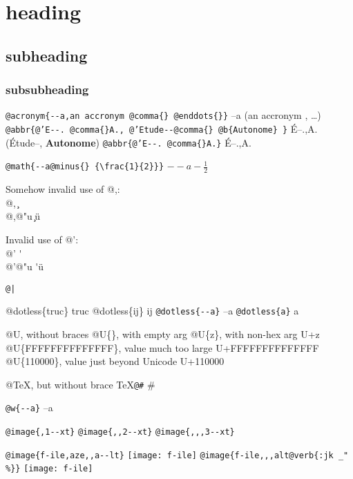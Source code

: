 \documentclass{book}
\newcommand{\GNUTexinfoplaceholder}[1]{}
\newcommand{\GNUTexinfonopagebreakheading}[2]{\let\clearpage\relax \let\cleardoublepage\relax \let\thispagestyle\GNUTexinfoplaceholder #1{#2}}
\renewcommand{\includegraphics}[1]{\fbox{FIG \detokenize{#1}}}
\begin{document}
\GNUTexinfonopagebreakheading{\section*}{{heading}}

\GNUTexinfonopagebreakheading{\subsection*}{{subheading}}

\GNUTexinfonopagebreakheading{\subsubsection*}{{subsubheading}}


\texttt{@acronym\{{-}{-}a,an accronym @comma\{\} @enddots\{\}\}} --a (an accronym , \dots{})
\texttt{@abbr\{@'E{-}{-}.\ @comma\{\}A.,\ @'Etude{-}{-}@comma\{\} @b\{Autonome\} \}} \'{E}--.\@ ,A.\@ (\'{E}tude--, \textbf{Autonome})
\texttt{@abbr\{@'E{-}{-}.\ @comma\{\}A.\}} \'{E}--.\@ ,A.\@

\texttt{@math\{{-}{-}a@minus\{\} \{\textbackslash{}frac\{1\}\{2\}\}\}} $--a- {\frac{1}{2}}$




Somehow invalid use of @,:\leavevmode{}\\
@, \c{}
\leavevmode{}\\
@,@"u \c{}\"{u}

Invalid use of @':\leavevmode{}\\
@' \'{}
\leavevmode{}\\
@'@"u \'{}\"{u}

\texttt{@|} 

@dotless\{truc\} truc
@dotless\{ij\} ij
\texttt{@dotless\{{-}{-}a\}} --a
\texttt{@dotless\{a\}} a

@U, without braces @U\{\}, with empty arg 
@U\{z\}, with non-hex arg U+z
@U\{FFFFFFFFFFFFFF\}, value much too large U+FFFFFFFFFFFFFF
@U\{110000\}, value just beyond Unicode U+110000

@TeX, but without brace \TeX{}\texttt{@\#} \#

\texttt{@w\{{-}{-}a\}} \hbox{--a}

\texttt{@image\{,1{-}{-}xt\}} 
\texttt{@image\{{,}{,}2{-}{-}xt\}} 
\texttt{@image\{{,}{,},3{-}{-}xt\}} 

\texttt{@image\{f-ile,aze{,}{,}a{-}{-}lt\}} \texttt{[image: f-ile]}
\texttt{@image\{f-ile{,}{,},alt@verb\{:jk \_" \%\@\}\}} \texttt{[image: f-ile]}
\end{document}
